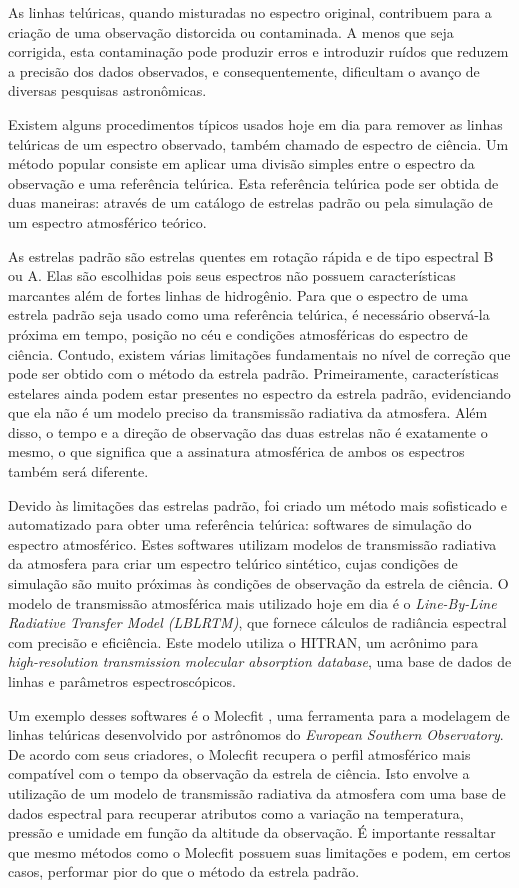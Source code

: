 As linhas telúricas, quando misturadas no espectro original, contribuem para a criação de uma observação distorcida ou contaminada. A menos que seja corrigida, esta contaminação pode produzir erros e introduzir ruídos que reduzem a precisão dos dados observados, e consequentemente, dificultam o avanço de diversas pesquisas astronômicas.

Existem alguns procedimentos típicos usados hoje em dia para remover as linhas telúricas de um espectro observado, também chamado de espectro de ciência. Um método popular consiste em aplicar uma divisão simples entre o espectro da observação e uma referência telúrica. Esta referência telúrica pode ser obtida de duas maneiras: através de um catálogo de estrelas padrão ou pela simulação de um espectro atmosférico teórico.

As estrelas padrão são estrelas quentes em rotação rápida e de tipo espectral B ou A. Elas são escolhidas pois seus espectros não possuem características marcantes além de fortes linhas de hidrogênio. Para que o espectro de uma estrela padrão seja usado como uma referência telúrica, é necessário observá-la próxima em tempo, posição no céu e condições atmosféricas do espectro de ciência. Contudo, existem várias limitações fundamentais no nível de correção que pode ser obtido com o método da estrela padrão. Primeiramente, características estelares ainda podem estar presentes no espectro da estrela padrão, evidenciando que ela não é um modelo preciso da transmissão radiativa da atmosfera. Além disso, o tempo e a direção de observação das duas estrelas não é exatamente o mesmo, o que significa que a assinatura atmosférica de ambos os espectros também será diferente.

Devido às limitações das estrelas padrão, foi criado um método mais sofisticado e automatizado para obter uma referência telúrica: softwares de simulação do espectro atmosférico. Estes softwares utilizam modelos de transmissão radiativa da atmosfera para criar um espectro telúrico sintético, cujas condições de simulação são muito próximas às condições de observação da estrela de ciência. O modelo de transmissão atmosférica mais utilizado hoje em dia é o \textit{Line-By-Line Radiative Transfer Model (LBLRTM)}, que fornece cálculos de radiância espectral com precisão e eficiência. Este modelo utiliza o HITRAN, um acrônimo para \textit{high-resolution transmission molecular absorption database}, uma base de dados de linhas e parâmetros espectroscópicos. 

Um exemplo desses softwares é o Molecfit \citep{smette2015molecfit}, uma ferramenta para a modelagem de linhas telúricas desenvolvido por astrônomos do \textit{European Southern Observatory}. De acordo com seus criadores, o Molecfit recupera o perfil atmosférico mais compatível com o tempo da observação da estrela de ciência. Isto envolve a utilização de um modelo de transmissão radiativa da atmosfera com uma base de dados espectral para recuperar atributos como a variação na temperatura, pressão e umidade em função da altitude da observação. É importante ressaltar que mesmo métodos como o Molecfit possuem suas limitações e podem, em certos casos, performar pior do que o método da estrela padrão.


